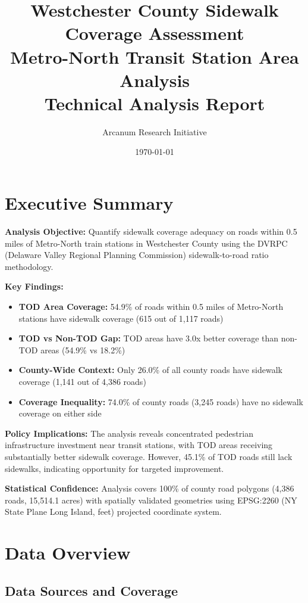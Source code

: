 \documentclass[11pt,letterpaper]{article}
\title{\textbf{Westchester County Sidewalk Coverage Assessment}\\
\large Metro-North Transit Station Area Analysis\\
Technical Analysis Report}
\author{Arcanum Research Initiative}
\date{\today}
\begin{document}
\maketitle

\tableofcontents
\newpage

\section{Executive Summary}

\textbf{Analysis Objective:} Quantify sidewalk coverage adequacy on roads within 0.5 miles of Metro-North train stations in Westchester County using the DVRPC (Delaware Valley Regional Planning Commission) sidewalk-to-road ratio methodology.

\textbf{Key Findings:}
\begin{itemize}
    \item \textbf{TOD Area Coverage:} 54.9\% of roads within 0.5 miles of Metro-North stations have sidewalk coverage (615 out of 1,117 roads)
    \item \textbf{TOD vs Non-TOD Gap:} TOD areas have 3.0x better coverage than non-TOD areas (54.9\% vs 18.2\%)
    \item \textbf{County-Wide Context:} Only 26.0\% of all county roads have sidewalk coverage (1,141 out of 4,386 roads)
    \item \textbf{Coverage Inequality:} 74.0\% of county roads (3,245 roads) have no sidewalk coverage on either side
\end{itemize}

\textbf{Policy Implications:} The analysis reveals concentrated pedestrian infrastructure investment near transit stations, with TOD areas receiving substantially better sidewalk coverage. However, 45.1\% of TOD roads still lack sidewalks, indicating opportunity for targeted improvement.

\textbf{Statistical Confidence:} Analysis covers 100\% of county road polygons (4,386 roads, 15,514.1 acres) with spatially validated geometries using EPSG:2260 (NY State Plane Long Island, feet) projected coordinate system.

\section{Data Overview}

\subsection{Data Sources and Coverage}
\end{document}
